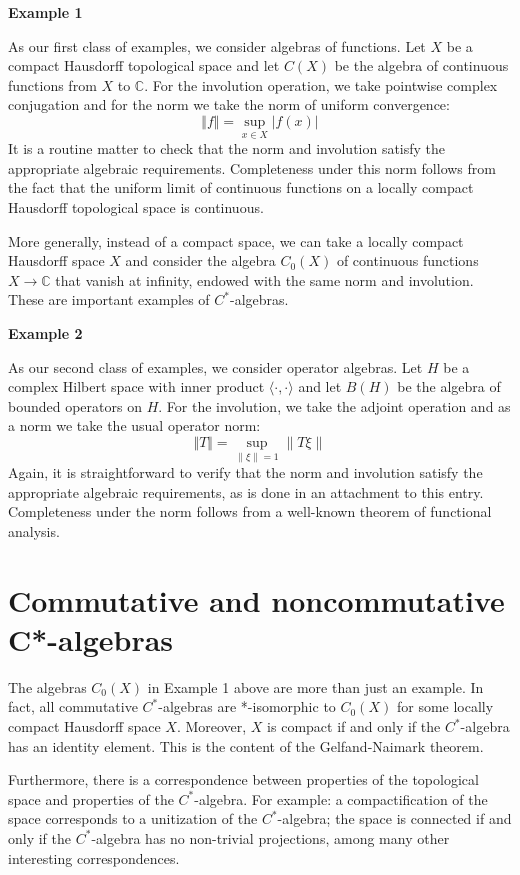 \documentclass[12pt]{article}
\newcommand*{\norm}[1]{\Vert #1\Vert}
\theoremstyle{inlinedefn}
\theoremstyle{break}
\begin{document}
{\bf Example 1}

As our first class of examples, we consider algebras of functions.
Let $X$ be a compact Hausdorff topological space and let 
$C(X)$ be the algebra of continuous functions from $X$ to 
$\mathbb{C}$.  For the involution operation, 
we take pointwise complex conjugation and for the norm we take the 
norm of uniform convergence:
\[
 \norm{f} = \sup_{x \in X} |f(x)|
\]
It is a routine matter to check that the norm and involution 
satisfy the appropriate algebraic requirements.  Completeness 
under this norm follows from the fact that the uniform limit 
of continuous functions on a locally compact Hausdorff topological 
space is continuous.

More generally, instead of a compact space, we can take a locally compact Hausdorff space $X$ and consider the algebra $C_0(X)$ of continuous functions $X \to \mathbb{C}$ that vanish at infinity, endowed with the same norm and involution. These are important examples of $C^*$-algebras.

{\bf Example 2}

As our second class of examples, we consider operator algebras.
Let $H$ be a complex Hilbert space with inner product $\langle \cdot , \cdot \rangle$ and 
let $B(H)$ be the algebra of bounded operators on $H$. For the
involution, we take the adjoint operation and as a norm we 
take the usual operator norm:
\[
 \norm{T} = \sup_{\|\xi\| = 1} \|T\xi\|
\]
Again, it is straightforward to verify that the norm and
involution satisfy the appropriate algebraic requirements,
as is done in an attachment to this entry.  Completeness
under the norm follows from a well-known theorem of 
functional analysis.

\section{Commutative and noncommutative C*-algebras}

The algebras $C_0(X)$ in Example 1 above are more than just an example. In fact, all commutative $C^*$-algebras are *-isomorphic to $C_0(X)$ for some locally compact Hausdorff space $X$. Moreover, $X$ is compact if and only if the $C^*$-algebra has an identity element. This is the content of the Gelfand-Naimark theorem.

Furthermore, there is a correspondence between properties of the topological space and properties of the $C^*$-algebra. For example: a compactification of the space corresponds to a unitization of the $C^*$-algebra; the space is connected if and only if the $C^*$-algebra has no non-trivial projections, among many other interesting correspondences.
\end{document}
